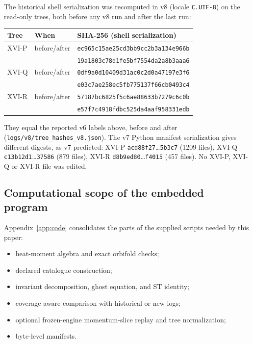 \documentclass[11pt,a4paper]{article}
\newcommand{\loc}[1]{\nolinkurl{#1}}
\theoremstyle{plain}
\theoremstyle{definition}
\theoremstyle{remark}
\numberwithin{equation}{section}
\begin{document}
The historical shell serialization was recomputed in v8
(locale \loc{C.UTF-8}) on the read-only trees, both before
any v8 run and after the last run:
\begin{center}
\scriptsize
\begin{tabular}{@{}lll@{}}
\toprule
Tree & When & SHA-256 (shell serialization)\\
\midrule
XVI-P & before/after & \texttt{ec965c15ae25cd3bb9cc2b3a134e966b}\\
&&\texttt{19a1803c78d1fe5bf7554da2a8b3aaa6}\\

XVI-Q & before/after & \texttt{0df9a0d10409d31ac0c2d0a47197e3f6}\\
&&\texttt{e03c7ae258ec5fb775137f66cb0493c4}\\

XVI-R & before/after & \texttt{57187bc6825f5c6ae88633b7279c6c0b}\\
&&\texttt{e57f7c4918fdbc525da4aaf958331edb}\\
\bottomrule
\end{tabular}
\end{center}
They equal the reported v6 labels above, before and after
(\loc{logs/v8/tree_hashes_v8.json}). The v7 Python manifest
serialization gives different digests, as v7 predicted:
XVI-P \texttt{acd88f27}\ldots\texttt{5b3c7} (1209 files), XVI-Q \texttt{c13b12d1}\ldots\texttt{37586} (879 files), XVI-R \texttt{d8b9ed80}\ldots\texttt{f4015} (457 files).
No XVI-P, XVI-Q or XVI-R file was edited.

\subsection{Computational scope of the embedded program}

Appendix~\ref{app:code} consolidates the parts of the supplied
scripts needed by this paper:
\begin{itemize}
\item heat-moment algebra and exact orbifold checks;
\item declared catalogue construction;
\item invariant decomposition, ghost equation, and ST identity;
\item coverage-aware comparison with historical or new logs;
\item optional frozen-engine momentum-slice replay and tree
normalization;
\item byte-level manifests.
\end{itemize}
\end{document}
